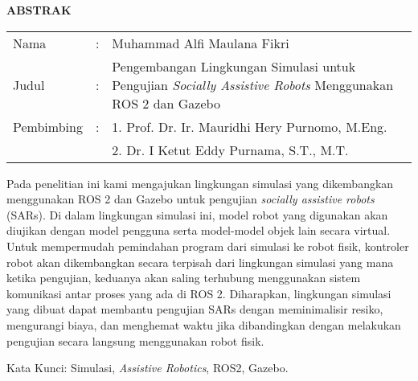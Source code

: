 \begin{center}
  \large\textbf{ABSTRAK}
\end{center}

\vspace{2ex}

\begingroup
  \setlength{\tabcolsep}{0pt}
  \noindent
  \begin{tabularx}{\textwidth}{l >{\centering}m{2em} X}
    Nama        &:& Muhammad Alfi Maulana Fikri \\
    Judul       &:&	Pengembangan Lingkungan Simulasi untuk Pengujian \emph{Socially Assistive Robots} Menggunakan ROS 2 dan Gazebo \\
    Pembimbing  &:& 1. Prof. Dr. Ir. Mauridhi Hery Purnomo, M.Eng. \\
                & & 2. Dr. I Ketut Eddy Purnama, S.T., M.T. \\
  \end{tabularx}
\endgroup

Pada penelitian ini kami mengajukan lingkungan simulasi yang dikembangkan menggunakan ROS 2 dan Gazebo untuk pengujian \emph{socially assistive robots} (SARs).
Di dalam lingkungan simulasi ini, model robot yang digunakan akan diujikan dengan model pengguna serta model-model objek lain secara virtual.
Untuk mempermudah pemindahan program dari simulasi ke robot fisik, kontroler robot akan dikembangkan secara terpisah dari lingkungan simulasi yang mana ketika pengujian, keduanya akan saling terhubung menggunakan sistem komunikasi antar proses yang ada di ROS 2.
Diharapkan, lingkungan simulasi yang dibuat dapat membantu pengujian SARs dengan meminimalisir resiko, mengurangi biaya, dan menghemat waktu jika dibandingkan dengan melakukan pengujian secara langsung menggunakan robot fisik.

Kata Kunci: Simulasi, \emph{Assistive Robotics}, ROS2, Gazebo.
